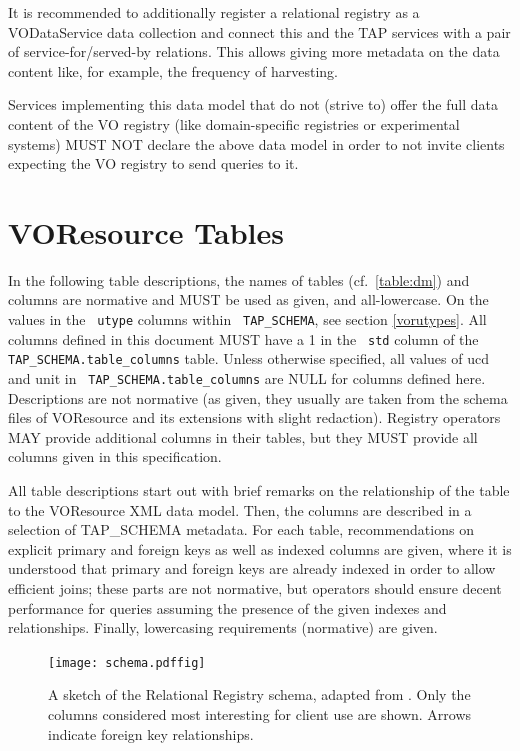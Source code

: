 \documentclass[11pt,a4paper]{ivoa}
\newcommand{\tapent}[1]{\texttt{\color{tapcolor} #1}}
\begin{document}
It is recommended to additionally register a relational registry as a
VODataService data collection and connect this and the TAP services
with a pair of service-for/served-by relations.  This allows giving more
metadata on the data content like, for example, the frequency of
harvesting.

Services implementing this data model that do not (strive to) offer
the full data content of the VO registry (like domain-specific
registries or experimental systems) MUST NOT declare the above data
model in order to not invite clients expecting the VO registry to send
queries to it.




\section{VOResource Tables}

\label{vortables}

In the following table descriptions, the names of tables
(cf.~\ref{table:dm}) and columns
are normative and MUST be used as given, and all-lowercase.  On the
values in the \tapent{utype} columns within \tapent{TAP\_SCHEMA},
see section \ref{vorutypes}.  All columns defined in
this document MUST have a 1 in the \tapent{std} column of the
\tapent{TAP\_SCHEMA.table\_columns} table.  Unless otherwise
specified, all values of ucd and unit in
\tapent{TAP\_SCHEMA.table\_columns} are NULL for columns defined here.
Descriptions are not normative (as given, they usually are taken from
the schema files of VOResource and its extensions with slight
redaction).  Registry operators MAY provide additional columns in their
tables, but they MUST provide all columns given in this
specification.

All table descriptions start out with brief remarks on the
relationship of the table to the VOResource XML data model.  Then, the
columns are described in a selection of TAP\_SCHEMA metadata. For each
table, recommendations on explicit primary and foreign keys as well as
indexed columns are given, where it is understood that primary and
foreign keys are already indexed in order to allow efficient joins;
these parts are not normative, but operators should ensure decent
performance for queries assuming the presence of the given indexes and
relationships.  Finally, lowercasing requirements
(normative) are given.


\begin{figure}

\texttt{[image: schema.pdffig]}
\caption{A sketch of the
Relational Registry schema, adapted from \citep{regtap-adass}.  
Only the columns considered
most interesting for client use are shown.  Arrows indicate foreign
key relationships.}
\end{figure}
\end{document}
